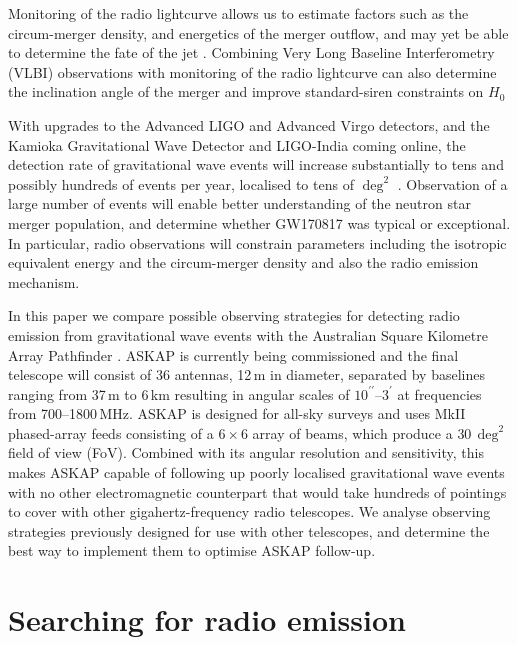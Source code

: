 Monitoring of the radio lightcurve allows us to estimate factors such as the circum-merger density, and energetics of the merger outflow, and may yet be able to determine the fate of the jet \citep{2018MNRAS.478..407N}. Combining Very Long Baseline Interferometry (VLBI) observations with monitoring of the radio lightcurve can also determine the inclination angle of the merger \citep{2018Natur.561..355M} and improve standard-siren constraints on $H_0$ \citep{2017Natur.551...85A,2019NatAs...3..940H}

With upgrades to the Advanced LIGO and Advanced Virgo detectors, and the Kamioka Gravitational Wave Detector \citep[KAGRA;][]{2012CQGra..29l4007S,2013PhRvD..88d3007A} and LIGO-India \citep{2013IJMPD..2241010U} coming online, the detection rate of gravitational wave events will increase substantially to tens and possibly hundreds of events per year, localised to tens of $\deg^2$ \citep{2018LRR....21....3A}. Observation of a large number of events will enable better understanding of the neutron star merger population, and determine whether GW170817 was typical or exceptional. In particular, radio observations will constrain parameters including the isotropic equivalent energy and the circum-merger density and also the radio emission mechanism. 

In this paper we compare possible observing strategies for detecting radio emission from gravitational wave events with the Australian Square Kilometre Array Pathfinder \citep[ASKAP;][]{2008ExA....22..151J}. ASKAP is currently being commissioned and the final telescope will consist of 36 antennas, 12\,m in diameter, separated by baselines ranging from 37\,m to 6\,km resulting in angular scales of $10^{\prime\prime}$--$3^\prime$ at frequencies from 700--1800\,MHz. ASKAP is designed for all-sky surveys and uses MkII phased-array feeds \citep[PAFs,][]{HampsonPAF} consisting of a $6\times6$ array of beams, which produce a $30\,\deg^{2}$ field of view (FoV). Combined with its angular resolution and sensitivity, this makes ASKAP capable of following up poorly localised gravitational wave events with no other electromagnetic counterpart that would take hundreds of pointings to cover with other gigahertz-frequency radio telescopes. We analyse observing strategies previously designed for use with other telescopes, and determine the best way to implement them to optimise ASKAP follow-up.


\section{Searching for radio emission}
